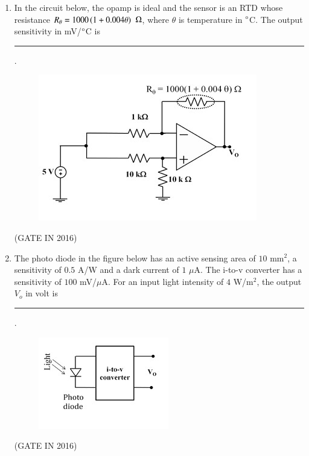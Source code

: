 \documentclass[journal,12pt,onecolumn]{IEEEtran}
\theoremstyle{remark}
\begin{document}
\begin{enumerate}
\item In the circuit below, the opamp is ideal and the sensor is an RTD whose resistance $R_\theta = 1000 \left(1 + 0.004 \theta\right)$ $\ohm$, where $\theta$ is temperature in $\degree$C. The output sensitivity in mV/$\degree$C is \rule{2cm}{0.4pt}.
\begin{figure}[H]
\centering
\includegraphics[width=0.7\columnwidth]{figs/z27.jpg}
\caption*{}
\label{fig:z27}
\end{figure}

\hfill{(GATE IN 2016)}

\item The photo diode in the figure below has an active sensing area of $10$ mm$^2$, a sensitivity of $0.5$ A/W and a dark current of $1$ $\mu$A. The i-to-v converter has a sensitivity of $100$ mV/$\mu$A. For an input light intensity of $4$ W/m$^2$, the output $V_o$ in volt is \rule{2cm}{0.4pt}.
\begin{figure}[H]
\centering
\includegraphics[width=0.5\columnwidth]{figs/z28.jpg}
\caption*{}
\label{fig:z28}
\end{figure}

\hfill{(GATE IN 2016)}


\end{enumerate}
\end{document}
